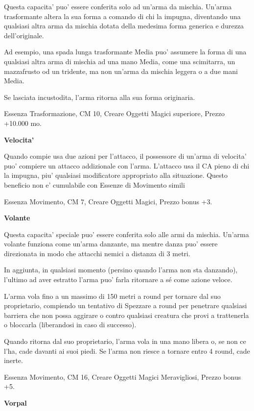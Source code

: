 \documentclass[a4paper,11pt,twoside,openany]{book}
\begin{document}
{		Questa capacita' puo' essere conferita solo ad un'arma da mischia. Un'arma trasformante altera la sua forma a comando di chi la impugna, diventando una qualsiasi altra arma da mischia dotata della medesima forma generica e durezza dell'originale. 
		
		Ad esempio, una spada lunga trasformante Media puo' assumere la forma di una qualsiasi altra arma di mischia ad una mano Media, come una scimitarra, un mazzafrusto od un tridente, ma non un'arma da mischia leggera o a due mani Media. 
		
		Se lasciata incustodita, l'arma ritorna alla sua forma originaria.
		
		Essenza Trasformazione, CM 10, Creare Oggetti Magici superiore, Prezzo +10.000 mo.
		
		\textbf{Velocita'}
		
		Quando compie usa due azioni per l'attacco, il possessore di un'arma di velocita' puo' compiere un attacco addizionale con l'arma. L'attacco usa il CA pieno di chi la impugna, piu' qualsiasi modificatore appropriato alla situazione. Questo beneficio non e' cumulabile con Essenze di Movimento simili
		
		Essenza Movimento, CM 7, Creare Oggetti Magici, Prezzo bonus +3.
		
		\textbf{Volante}
		
		Questa capacita' speciale puo' essere conferita solo alle armi da mischia. Un'arma volante funziona come un'arma danzante, ma mentre danza puo' essere direzionata in modo che attacchi nemici a distanza di 3 metri. 
		
		In aggiunta, in qualsiasi momento (persino quando l'arma non sta danzando), l'ultimo ad aver estratto l'arma puo' farla ritornare a sé come azione veloce. 
		
		L'arma vola fino a un massimo di 150 metri a round per tornare dal suo proprietario, compiendo un tentativo di Spezzare a round per penetrare qualsiasi barriera che non possa aggirare o contro qualsiasi creatura che provi a trattenerla o bloccarla (liberandosi in caso di successo). 
		
		Quando ritorna dal suo proprietario, l'arma vola in una mano libera o, se non ce l'ha, cade davanti ai suoi piedi. Se l'arma non riesce a tornare entro 4 round, cade inerte.
		
		Essenza Movimento, CM 16, Creare Oggetti Magici Meravigliosi, Prezzo bonus +5.
		
		\textbf{Vorpal}
		
}
\end{document}
